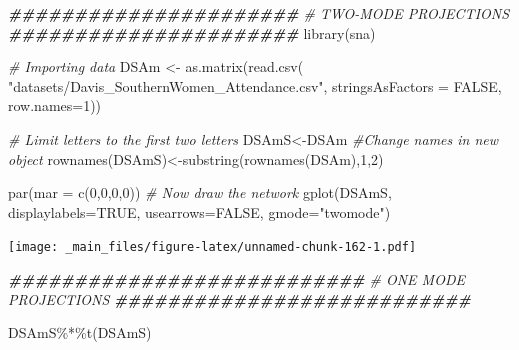 \documentclass[
  notitlepage,
  onecolumn,
  openany]{book}
\newenvironment{Shaded}{\begin{snugshade}}{\end{snugshade}}
\newcommand{\AttributeTok}[1]{\textcolor[rgb]{0.77,0.63,0.00}{#1}}
\newcommand{\CommentTok}[1]{\textcolor[rgb]{0.56,0.35,0.01}{\textit{#1}}}
\newcommand{\ConstantTok}[1]{\textcolor[rgb]{0.00,0.00,0.00}{#1}}
\newcommand{\DecValTok}[1]{\textcolor[rgb]{0.00,0.00,0.81}{#1}}
\newcommand{\DocumentationTok}[1]{\textcolor[rgb]{0.56,0.35,0.01}{\textbf{\textit{#1}}}}
\newcommand{\FunctionTok}[1]{\textcolor[rgb]{0.00,0.00,0.00}{#1}}
\newcommand{\NormalTok}[1]{#1}
\newcommand{\OtherTok}[1]{\textcolor[rgb]{0.56,0.35,0.01}{#1}}
\newcommand{\SpecialCharTok}[1]{\textcolor[rgb]{0.00,0.00,0.00}{#1}}
\newcommand{\StringTok}[1]{\textcolor[rgb]{0.31,0.60,0.02}{#1}}
\begin{document}
\begin{Shaded}
\begin{Highlighting}[]
\DocumentationTok{\#\#\#\#\#\#\#\#\#\#\#\#\#\#\#\#\#\#\#\#\#\#}
\CommentTok{\# TWO{-}MODE PROJECTIONS}
\DocumentationTok{\#\#\#\#\#\#\#\#\#\#\#\#\#\#\#\#\#\#\#\#\#\#}
\FunctionTok{library}\NormalTok{(sna)}

\CommentTok{\# Importing data}
\NormalTok{DSAm }\OtherTok{\textless{}{-}} \FunctionTok{as.matrix}\NormalTok{(}\FunctionTok{read.csv}\NormalTok{(}
    \StringTok{"datasets/Davis\_SouthernWomen\_Attendance.csv"}\NormalTok{,}
    \AttributeTok{stringsAsFactors =} \ConstantTok{FALSE}\NormalTok{, }\AttributeTok{row.names=}\DecValTok{1}\NormalTok{))}


\CommentTok{\# Limit letters to the first two letters}
\NormalTok{DSAmS}\OtherTok{\textless{}{-}}\NormalTok{DSAm}
\CommentTok{\#Change names in new object}
\FunctionTok{rownames}\NormalTok{(DSAmS)}\OtherTok{\textless{}{-}}\FunctionTok{substring}\NormalTok{(}\FunctionTok{rownames}\NormalTok{(DSAm),}\DecValTok{1}\NormalTok{,}\DecValTok{2}\NormalTok{)}

\FunctionTok{par}\NormalTok{(}\AttributeTok{mar =} \FunctionTok{c}\NormalTok{(}\DecValTok{0}\NormalTok{,}\DecValTok{0}\NormalTok{,}\DecValTok{0}\NormalTok{,}\DecValTok{0}\NormalTok{))}
\CommentTok{\# Now draw the network}
\FunctionTok{gplot}\NormalTok{(DSAmS, }\AttributeTok{displaylabels=}\ConstantTok{TRUE}\NormalTok{, }
      \AttributeTok{usearrows=}\ConstantTok{FALSE}\NormalTok{, }\AttributeTok{gmode=}\StringTok{"twomode"}\NormalTok{)}
\end{Highlighting}
\end{Shaded}

\texttt{[image: \_main\_files/figure-latex/unnamed-chunk-162-1.pdf]}

\begin{Shaded}
\begin{Highlighting}[]
\DocumentationTok{\#\#\#\#\#\#\#\#\#\#\#\#\#\#\#\#\#\#\#\#\#\#\#\#\#\#\#}
\CommentTok{\# ONE MODE PROJECTIONS}
\DocumentationTok{\#\#\#\#\#\#\#\#\#\#\#\#\#\#\#\#\#\#\#\#\#\#\#\#\#\#\#}

\NormalTok{DSAmS}\SpecialCharTok{\%*\%}\FunctionTok{t}\NormalTok{(DSAmS)}
\end{Highlighting}
\end{Shaded}
\end{document}
